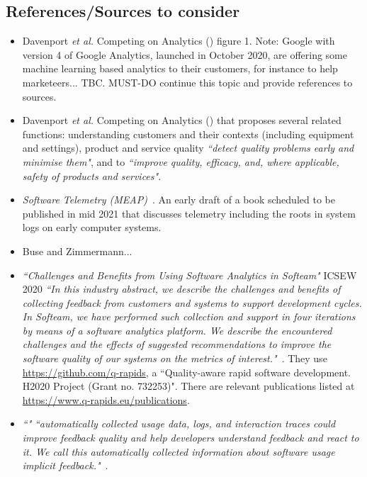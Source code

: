 \subsection{References/Sources to consider}
\begin{itemize}

    \item Davenport \textit{et al.} Competing on Analytics (\cite{davenport2017competing_on_analytics}) figure 1. Note: Google with version 4 of Google Analytics, launched in October 2020, are offering some machine learning based analytics to their customers, for instance to help marketeers... TBC. MUST-DO continue this topic and provide references to sources.
    
    \item Davenport \textit{et al.} Competing on Analytics (\cite{davenport2006competing_on_analytics}) that proposes several related functions: understanding customers and their contexts (including equipment and settings), product and service quality \emph{``detect quality problems early and minimise them"}, and to \emph{``improve quality, efficacy, and, where applicable, safety of products and services"}.
    
    \item \emph{Software Telemetry (MEAP)}~\citep{riedesel2020_software_telemetry_meap_v04}. An early draft of a book scheduled to be published in mid 2021 that discusses telemetry including the roots in system logs on early computer systems.
    
    \item Buse and Zimmermann...~\cite{buse_analytics_2010} 
    
    \item \emph{``Challenges and Benefits from Using Software Analytics in Softeam"} ICSEW 2020 \emph{``In this industry abstract, we describe the challenges and benefits of collecting feedback from customers and systems to support development cycles. In Softeam, we have performed such collection and support in four iterations by means of a software analytics platform. We describe the encountered challenges and the effects of suggested recommendations to improve the software quality of our systems on the metrics of interest."}~\cite{bagnato2020_challenges_and_benefits_from_using_software_analytics_in_softeam}. They use \url{https://github.com/q-rapids}, a ``Quality-aware rapid software development. H2020 Project (Grant no. 732253)". There are relevant publications listed at \url{https://www.q-rapids.eu/publications}.
    \item \emph{``"} \emph{``automatically collected usage data, logs, and interaction traces could improve feedback quality and help developers understand feedback and react to it. We call this automatically collected information about software usage implicit feedback."}~\citep{maalej2016_towards_data_driven_requirements_engineering}. 
    

\end{itemize}
